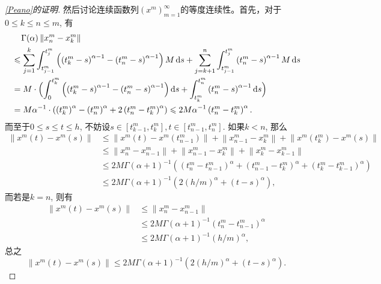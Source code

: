 \begin{proof}[\cref{Peano}的证明]
    然后讨论连续函数列$\left(x^m\right)_{m=1}^\infty$的等度连续性。首先，对于$0\leqslant k\leqslant n\leqslant m$, 有
    \begin{align*}
        &\relphantom{\leqslant}\Gamma(\alpha)\left\| x^m_n-x^m_k \right\|
        \\ &\leqslant \sum_{j=1}^{k}\int_{t^m_{j-1}}^{t^m_j}\left(\left(t^m_k-s\right)^{\alpha-1}-\left(t^m_n-s\right)^{\alpha-1}\right)M\differential s+\sum_{j=k+1}^{n}\int_{t^m_{j-1}}^{t^m_j}\left(t^m_n-s\right)^{\alpha-1}M\differential s
        \\ &=M\cdot\Bigl(\int_{0}^{t^m_k}\left(\left(t^m_k-s\right)^{\alpha-1}-\left(t^m_n-s\right)^{\alpha-1}\right)\differential s+\int_{t^m_k}^{t^m_n}\left(t^m_n-s\right)^{\alpha-1}\differential s\Bigr)
        \\ &=M\alpha^{-1}\cdot \left(\left(t^m_k\right) ^\alpha-\left(t^m_n\right)^\alpha+2\left(t^m_n-t^m_k\right)^\alpha\right)\leqslant 2M\alpha^{-1}\left(t^m_n-t^m_k\right)^\alpha.
    \end{align*}
    而至于$0\leqslant s\leqslant t\leqslant h$, 不妨设$s\in\left[t^m_{k-1},t^m_k\right],t\in\left[t^m_{n-1},t^m_n\right]$. 如果$k<n$, 那么
    \begin{align*}
        \left\| x^m(t)-x^m(s) \right\|
        &\leqslant \left\| x^m(t)-x^m(t^m_{n-1}) \right\|+\left\| x^m_{n-1}-x^m_k \right\|+\left\| x^m(t^m_k)-x^m(s) \right\|
        \\ &\leqslant \left\|x^m_{n}-x^m_{n-1}\right\|+\left\| x^m_{n-1}-x^m_k \right\|+\left\|x^m_{k}-x^m_{k-1}\right\|
        \\ &\leqslant 2M\Gamma(\alpha+1)^{-1}\left(\left(t^m_n-t^m_{n-1}\right)^\alpha + \left( t^m_{n-1}-t^m_{k}\right)^\alpha + \left(t^m_k-t^m_{k-1}\right)^\alpha\right)
        \\ &\leqslant 2M\Gamma(\alpha+1)^{-1}\left(2(h/m)^\alpha+(t-s)^\alpha\right),
    \end{align*}
    而若是$k=n$, 则有
    \begin{align*}
        \left\| x^m(t)-x^m(s) \right\| &\leqslant \left\|x^m_{n}-x^m_{n-1}\right\|
        \\ &\leqslant 2M\Gamma(\alpha+1)^{-1}\left(t^m_n-t^m_{n-1}\right)^\alpha
        \\ &\leqslant 2M\Gamma(\alpha+1)^{-1}(h/m)^\alpha,
    \end{align*}
    总之
    \begin{equation}\label{xmts}
        \left\| x^m(t)-x^m(s) \right\| \leqslant 2M\Gamma(\alpha+1)^{-1}\left(2(h/m)^\alpha+(t-s)^\alpha\right).

\end{equation}
\end{proof}
